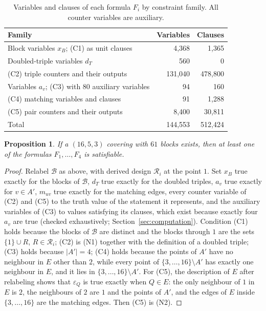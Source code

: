 \documentclass[11pt]{amsart}
\newtheorem{proposition}[theorem]{Proposition}
\theoremstyle{definition}
\theoremstyle{remark}
\newcommand{\cB}{\mathcal{B}}
\newcommand{\cR}{\mathcal{R}}
\begin{document}
\begin{table}[ht]
\centering
\small
\caption{Variables and clauses of each formula $F_i$ by constraint family.
All counter variables are auxiliary.}\label{tab:families}
\begin{tabular}{@{}lrr@{}}
\toprule
Family & Variables & Clauses\\
\midrule
Block variables $x_B$; (C1) as unit clauses & 4{,}368 & 1{,}365\\
Doubled-triple variables $d_T$ & 560 & 0\\
(C2) triple counters and their outputs & 131{,}040 & 478{,}800\\
Variables $a_v$; (C3) with 80 auxiliary variables & 94 & 160\\
(C4) matching variables and clauses & 91 & 1{,}288\\
(C5) pair counters and their outputs & 8{,}400 & 30{,}811\\
\midrule
Total & 144{,}553 & 512{,}424\\
\bottomrule
\end{tabular}
\end{table}

\begin{proposition}\label{prop:reduction}
If a $(16,5,3)$ covering with $61$ blocks exists, then at least one of the
formulas $F_1,\dots,F_4$ is satisfiable.
\end{proposition}

\begin{proof}
Relabel $\cB$ as above, with derived design $\cR_i$ at the point $1$. Set
$x_B$ true exactly for the blocks of $\cB$, $d_T$ true exactly for the doubled
triples, $a_v$ true exactly for $v\in A'$, $m_{uv}$ true exactly for the
matching edges, every counter variable of (C2) and (C5) to the truth value
of the statement it represents, and the auxiliary variables of (C3) to values
satisfying its clauses, which exist because exactly four $a_v$ are true
(checked exhaustively; Section~\ref{sec:computation}). Condition (C1) holds
because the blocks of $\cB$ are distinct and the blocks through $1$ are the
sets $\{1\}\cup R$, $R\in\cR_i$;
(C2) is (N1) together with the definition of a doubled triple; (C3) holds
because $|A'|=4$; (C4) holds because the points of $A'$ have no neighbour in
$E$ other than $2$, while every point of $\{3,\dots,16\}\setminus A'$ has
exactly one neighbour in $E$, and it lies in $\{3,\dots,16\}\setminus A'$.
For (C5), the description of $E$ after relabeling shows that $\varepsilon_Q$
is true exactly when $Q\in E$: the only neighbour of $1$ in $E$ is $2$, the
neighbours of $2$ are $1$ and the points of $A'$, and the edges of $E$ inside
$\{3,\dots,16\}$ are the matching edges. Then (C5) is (N2).
\end{proof}
\end{document}
